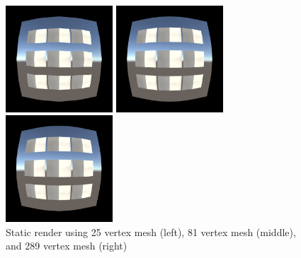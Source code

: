\documentclass[]{article}
\begin{document}
\begin{figure}[H]
	\centering
	\begin{minipage}[H]{0.2\textwidth}
		\includegraphics[width=4cm]{Barrel_Vec_32}
	\end{minipage}
	\hfill
	\begin{minipage}[H]{0.2\textwidth}
		\includegraphics[width=4cm]{Barrel_Vec_128}
	\end{minipage}
	\hfill
	\begin{minipage}[H]{0.2\textwidth}
		\includegraphics[width=4cm]{Barrel_Vec_45}
	\end{minipage}
	\caption{Static render using 25 vertex mesh (left), 81 vertex mesh (middle), and 289 vertex mesh (right)}
	\label{fig:vert_comp}
\end{figure}
\end{document}
